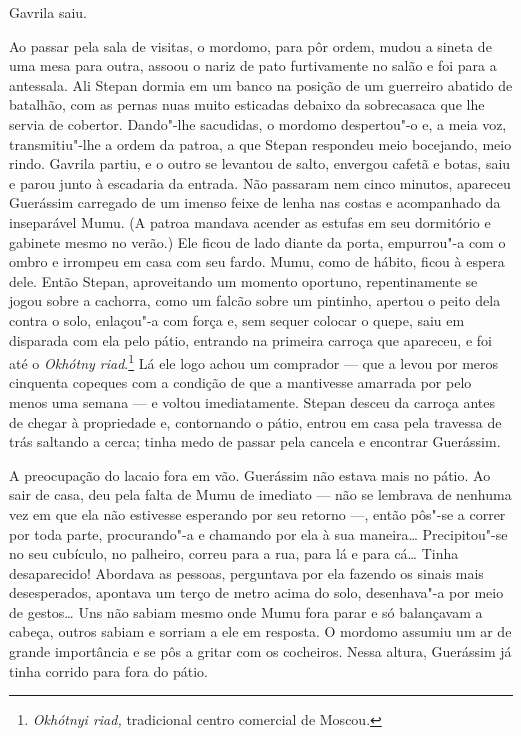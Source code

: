 Gavrila saiu.

Ao passar pela sala de visitas, o mordomo, para pôr ordem, mudou a
sineta de uma mesa para outra, assoou o nariz de pato furtivamente no
salão e foi para a antessala. Ali Stepan dormia em um banco na posição
de um guerreiro abatido de batalhão, com as pernas nuas muito esticadas
debaixo da sobrecasaca que lhe servia de cobertor. Dando"-lhe sacudidas,
o mordomo despertou"-o e, a meia voz, transmitiu"-lhe a ordem da patroa, a
que Stepan respondeu meio bocejando, meio rindo. Gavrila partiu, e o
outro se levantou de salto, envergou cafetã e botas, saiu e parou junto
à escadaria da entrada. Não passaram nem cinco minutos, apareceu
Guerássim carregado de um imenso feixe de lenha nas costas e acompanhado
da inseparável Mumu. (A patroa mandava acender as estufas em seu
dormitório e gabinete mesmo no verão.) Ele ficou de lado diante da
porta, empurrou"-a com o ombro e irrompeu em casa com seu fardo. Mumu,
como de hábito, ficou à espera dele. Então Stepan, aproveitando um
momento oportuno, repentinamente se jogou sobre a cachorra, como um
falcão sobre um pintinho, apertou o peito dela contra o solo, enlaçou"-a
com força e, sem sequer colocar o quepe, saiu em disparada com ela pelo
pátio, entrando na primeira carroça que apareceu, e foi até o
\emph{Okhótny riad}.\footnote{\emph{Okhótnyi riad,} tradicional
  centro comercial de Moscou.} Lá ele logo achou um comprador --- que a
levou por meros cinquenta copeques com a condição de que a mantivesse
amarrada por pelo menos uma semana --- e voltou imediatamente. Stepan
desceu da carroça antes de chegar à propriedade e, contornando o pátio,
entrou em casa pela travessa de trás saltando a cerca; tinha medo de
passar pela cancela e encontrar Guerássim.

A preocupação do lacaio fora em vão. Guerássim não estava mais no pátio.
Ao sair de casa, deu pela falta de Mumu de imediato --- não se lembrava
de nenhuma vez em que ela não estivesse esperando por seu retorno ---,
então pôs"-se a correr por toda parte, procurando"-a e chamando por ela à
sua maneira\ldots{} Precipitou"-se no seu cubículo, no palheiro, correu para a
rua, para lá e para cá\ldots{} Tinha desaparecido! Abordava as pessoas,
perguntava por ela fazendo os sinais mais desesperados, apontava um
terço de metro acima do solo, desenhava"-a por meio de gestos\ldots{} Uns não
sabiam mesmo onde Mumu fora parar e só balançavam a cabeça, outros
sabiam e sorriam a ele em resposta. O mordomo assumiu um ar de grande
importância e se pôs a gritar com os cocheiros. Nessa altura, Guerássim
já tinha corrido para fora do pátio.


